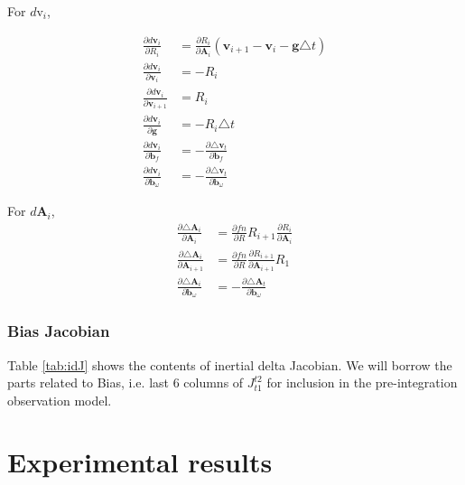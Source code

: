 \documentclass[12pt]{article}   %
\begin{document}
For $d\text{v}_{i}$,

\begin{align}
\frac{\partial d\textbf{v}_{i}}{\partial R_{i}} &= \frac{\partial R_i}{\partial \textbf{A}_i} (\textbf{v}_{i+1} - \textbf{v}_i - \textbf{g} \triangle t) \\
\frac{\partial d\textbf{v}_{i}}{\partial \textbf{v}_{i}} &= -R_i \\
\frac{\partial d\textbf{v}_{i}}{\partial \textbf{v}_{i+1}} &= R_i \\
\frac{\partial d\textbf{v}_{i}}{\partial \textbf{g}} &= -R_i \triangle t \\
\frac{\partial d\textbf{v}_{i}}{\partial \textbf{b}_f} &= - \frac{\partial \triangle \textbf{v}_t}{\partial \textbf{b}_f}\\
\frac{\partial d\textbf{v}_{i}}{\partial \textbf{b}_\omega} &= - \frac{\partial \triangle \textbf{v}_t}{\partial \textbf{b}_\omega}
\end{align}

For $d\textbf{A}_{i}$,
\begin{align}
\frac{\partial \triangle \textbf{A}_{i}}{\partial \textbf{A}_{i}} &= \frac{\partial fn}{\partial R} R_{i+1} \frac{\partial R_i}{\partial \textbf{A}_{i}}\\
\frac{\partial \triangle \textbf{A}_{i}}{\partial \textbf{A}_{i+1}} &= \frac{\partial fn}{\partial R} \frac{\partial R_{i+1}}{\partial \textbf{A}_{i+1}} R_{1} \\
\frac{\partial \triangle \textbf{A}_{i}}{\partial \textbf{b}_\omega} &= - \frac{\partial \triangle \textbf{A}_t}{\partial \textbf{b}_\omega}
\end{align}

\subsubsection{Bias Jacobian}
Table \ref{tab:idJ} shows the contents of inertial delta Jacobian. We will borrow the parts related to Bias, i.e. last 6 columns of $J_{t1}^{t2}$ for inclusion in the pre-integration observation model.

\section{Experimental results}
\end{document}
